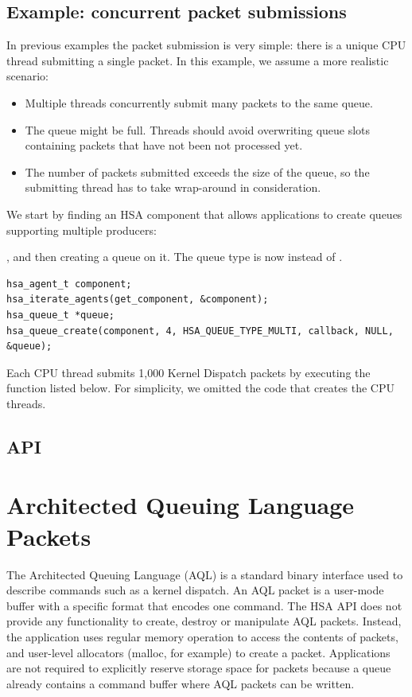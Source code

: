 \documentclass[final,oneside]{book}
\begin{document}
\subsection{Example: concurrent packet submissions}
In previous examples the packet submission is very simple: there is a unique CPU
thread submitting a single packet. In this example, we assume a more realistic
scenario:
\begin{itemize}[itemsep=1pt,topsep=3pt,partopsep=0pt]
\item Multiple threads concurrently submit many packets to the same queue.
\item The queue might be full. Threads should avoid overwriting queue slots
  containing packets that have not been not processed yet.
\item The number of packets submitted exceeds the size of the queue, so the
  submitting thread has to take wrap-around in consideration.
\end{itemize}

We start by finding an HSA component that allows applications to create queues
supporting multiple producers:


, and then creating a queue on it. The queue type is now
 instead of .
\begin{lstlisting}
hsa_agent_t component;
hsa_iterate_agents(get_component, &component);
hsa_queue_t *queue;
hsa_queue_create(component, 4, HSA_QUEUE_TYPE_MULTI, callback, NULL, &queue);
\end{lstlisting}
Each CPU thread submits 1,000 Kernel Dispatch packets by executing the function
listed below. For simplicity, we omitted the code that creates the CPU threads.




\subsection{API}


\section{Architected Queuing Language Packets}\label{sec:aql} The Architected
Queuing Language (AQL) is a standard binary interface used to describe commands
such as a kernel dispatch. An AQL packet is a user-mode buffer with a specific
format that encodes one command. The HSA API does not provide any functionality
to create, destroy or manipulate AQL packets. Instead, the application uses
regular memory operation to access the contents of packets, and user-level
allocators (malloc, for example) to create a packet. Applications are not
required to explicitly reserve storage space for packets because a
queue already contains a command buffer where AQL packets can be written.
\end{document}
